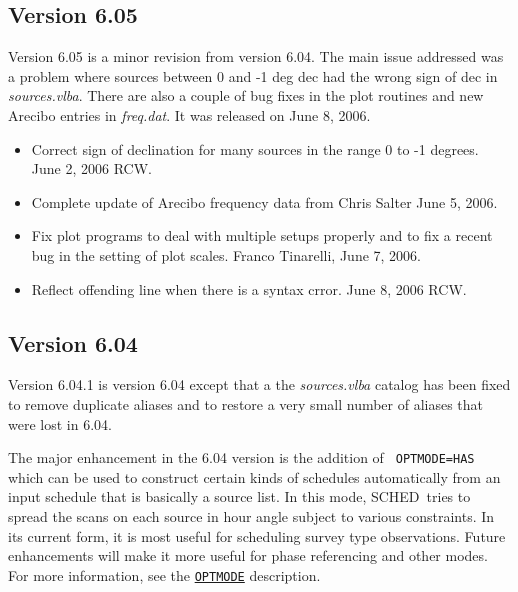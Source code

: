 \documentclass{report}
\newcommand{\schedb}{{\sc SCHED~}}
\begin{document}
\subsection{\label{SSEC:VER_6.05}Version 6.05}

Version 6.05 is a minor revision from version 6.04.  The main issue
addressed was a problem where sources between 0 and -1 deg dec had the
wrong sign of dec in {\sl sources.vlba}.  There are also a couple of
bug fixes in the plot routines and new Arecibo entries in {\sl
freq.dat}.  It was released on June 8, 2006.

\begin{itemize}

\item Correct sign of declination for many sources in the range 0 to -1 degrees.
June 2, 2006 RCW.

\item Complete update of Arecibo frequency data from Chris Salter  June 5, 2006.

\item Fix plot programs to deal with multiple setups properly and to fix a recent
bug in the setting of plot scales.  Franco Tinarelli, June 7, 2006.

\item Reflect offending line when there is a syntax crror.  June 8, 2006  RCW.

\end{itemize}


\subsection{\label{SSEC:VER_6.04}Version 6.04}

Version 6.04.1 is version 6.04 except that a the {\sl sources.vlba}
catalog has been fixed to remove duplicate aliases and to restore a
very small number of aliases that were lost in 6.04.

The major enhancement in the 6.04 version is the addition of {\tt
OPTMODE=HAS} which can be used to construct certain kinds of schedules
automatically from an input schedule that is basically a source list.
In this mode, \schedb tries to spread the scans on each source in
hour angle subject to various constraints.  In its current form, it is most
useful for scheduling survey type observations.  Future enhancements
will make it more useful for phase referencing and other modes.  For
more information, see the 
{\hyperref[MP:OPTMODE]{{\tt OPTMODE}}} description.
\end{document}
